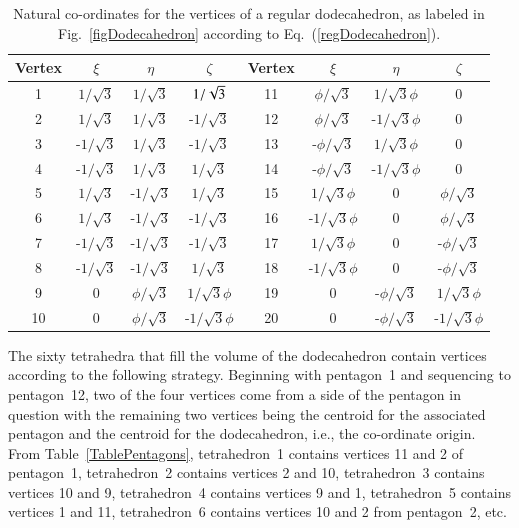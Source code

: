\begin{table}
	\begin{center}
	\begin{tabular}{|c|ccc||c|ccc|}
		\hline 
		Vertex & $\xi$ & $\eta$ & $\zeta$ & Vertex & $\xi$ & $\eta$ & $\zeta$ \\ \hline
		1 & $1 / \sqrt{3}$ & $1 / \sqrt{3}$ & $1 / \sqrt{3}^{\vphantom{|}}$ & 
		   11 & $\phi / \sqrt{3}$ & $1 / \sqrt{3} \phi$ & 0 \\
		2 & $1 / \sqrt{3}$ & $1 / \sqrt{3}$ & -$1 / \sqrt{3}$ & 
		   12 & $\phi / \sqrt{3}$ & -$1 / \sqrt{3}\phi$ & 0 \\
		3 & -$1 / \sqrt{3}$ & $1 / \sqrt{3}$ & -$1 / \sqrt{3}$ & 
		   13 & -$\phi / \sqrt{3}$ & $1/ \sqrt{3}\phi$ & 0 \\
		4 & -$1 / \sqrt{3}$ & $1 / \sqrt{3}$ & $1 / \sqrt{3}$ & 
		   14 & -$\phi / \sqrt{3}$ & -$1 / \sqrt{3}\phi$ & 0 \\
		5 & $1 / \sqrt{3}$ & -$1 / \sqrt{3}$ & $1 / \sqrt{3}$ & 
		   15 & $1 / \sqrt{3} \phi$ & 0 & $\phi / \sqrt{3}$ \\
		6 & $1 / \sqrt{3}$ & -$1 / \sqrt{3}$ & -$1 / \sqrt{3}$ & 
		   16 & -$1 / \sqrt{3}\phi$ & 0 & $\phi / \sqrt{3}$ \\
		7 & -$1 / \sqrt{3}$ & -$1 / \sqrt{3}$ & -$1 / \sqrt{3}$ & 
		   17 & $1 / \sqrt{3}\phi$ & 0 & -$\phi / \sqrt{3}$ \\
		8 & -$1 / \sqrt{3}$ & -$1 / \sqrt{3}$ & $1 / \sqrt{3}$ & 
		   18 & -$1 / \sqrt{3}\phi$ & 0 & -$\phi / \sqrt{3}$ \\
		9 & 0 & $\phi / \sqrt{3}$ & $1 / \sqrt{3}\phi$ & 
		   19 & 0 & -$\phi / \sqrt{3}$ & $1 / \sqrt{3}\phi$ \\
		10 & 0 & $\phi / \sqrt{3}$ & -$1 / \sqrt{3}\phi$ & 
		   20 & 0 & -$\phi / \sqrt{3}$ & -$1 / \sqrt{3}\phi$ \\
		\hline
	\end{tabular}
	\end{center}
	\caption{Natural co-ordinates for the vertices of a regular dodecahedron, as labeled in Fig.~\ref{figDodecahedron} according to Eq.~(\ref{regDodecahedron}).}
	\label{TableDodecahedron}
\end{table}

The sixty tetrahedra that fill the volume of the dodecahedron contain vertices according to the following strategy.  Beginning with pentagon~1 and sequencing to pentagon~12, two of the four vertices come from a side of the pentagon in question with the remaining two vertices being the centroid for the associated pentagon and the centroid for the dodecahedron, i.e., the co-ordinate origin.  From Table~\ref{TablePentagons}, tetrahedron~1 contains vertices 11 and 2 of pentagon~1, tetrahedron~2 contains vertices 2 and 10, tetrahedron~3 contains vertices 10 and 9, tetrahedron~4 contains vertices 9 and 1, tetrahedron~5 contains vertices 1 and 11, tetrahedron~6 contains vertices 10 and 2 from pentagon~2, etc.

